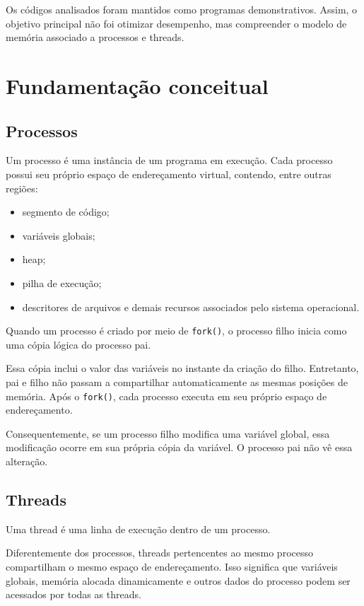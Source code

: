 Os códigos analisados foram mantidos como programas demonstrativos. Assim, o objetivo principal não foi otimizar desempenho, mas compreender o modelo de memória associado a processos e threads.

\section{Fundamentação conceitual}
\label{sec:atvd03-fundamentacao}

\subsection{Processos}

Um processo é uma instância de um programa em execução. Cada processo possui seu próprio espaço de endereçamento virtual, contendo, entre outras regiões:

\begin{itemize}
    \item segmento de código;
    \item variáveis globais;
    \item heap;
    \item pilha de execução;
    \item descritores de arquivos e demais recursos associados pelo sistema operacional.
\end{itemize}

Quando um processo é criado por meio de \texttt{fork()}, o processo filho inicia como uma cópia lógica do processo pai.

Essa cópia inclui o valor das variáveis no instante da criação do filho. Entretanto, pai e filho não passam a compartilhar automaticamente as mesmas posições de memória. Após o \texttt{fork()}, cada processo executa em seu próprio espaço de endereçamento.

Consequentemente, se um processo filho modifica uma variável global, essa modificação ocorre em sua própria cópia da variável. O processo pai não vê essa alteração.

\subsection{Threads}

Uma thread é uma linha de execução dentro de um processo.

Diferentemente dos processos, threads pertencentes ao mesmo processo compartilham o mesmo espaço de endereçamento. Isso significa que variáveis globais, memória alocada dinamicamente e outros dados do processo podem ser acessados por todas as threads.

